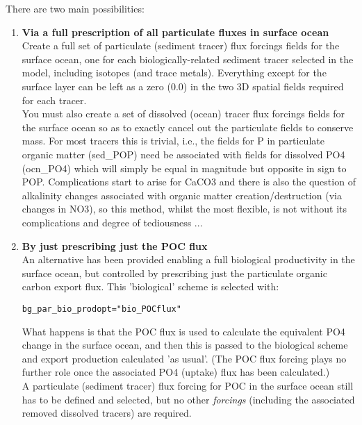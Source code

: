 There are two main possibilities:

\begin{enumerate}[noitemsep]

\vspace{1mm}
        \item \textbf{Via a full prescription of all particulate fluxes in surface ocean}
\vspace{1mm}
                \\Create a full set of particulate (sediment tracer) flux forcings fields for the surface ocean, one for each biologically-related sediment tracer selected in the model, including isotopes (and trace metals). Everything except for the surface layer can be left as a zero (0.0) in the two 3D spatial fields required for each tracer.
        \\You must also create a set of dissolved (ocean) tracer flux forcings fields for the surface ocean so as to exactly cancel out the particulate fields to conserve mass. For most tracers this is trivial, i.e., the fields for P in particulate organic matter (sed\_POP) need be associated with fields for dissolved PO4 (ocn\_PO4) which will simply be equal in magnitude but opposite in sign to POP. Complications start to arise for CaCO3 and there is also the question of alkalinity changes associated with organic matter creation/destruction (via changes in NO3), so this method, whilst the most flexible, is not without its complications and degree of tediousness ...

\vspace{1mm}
        \item \textbf{By just prescribing just the POC flux}
\vspace{1mm}
                \\An alternative has been provided enabling a full biological productivity in the surface ocean, but controlled by prescribing just the particulate organic carbon export flux. This 'biological' scheme is selected with:
\vspace{-2.5mm}\begin{verbatim}bg_par_bio_prodopt="bio_POCflux"\end{verbatim}\vspace{-2.5mm}
What happens is that the POC flux is used to calculate the equivalent PO4 change in the surface ocean, and then this is passed to the biological scheme and export production calculated 'as usual'. (The POC flux forcing plays no further role  once the associated PO4 (uptake) flux has been calculated.)
                \\A particulate (sediment tracer) flux forcing for POC in the surface ocean still has to be defined and selected, but no other \textit{forcings} (including the associated removed dissolved tracers) are required. 


\end{enumerate}
